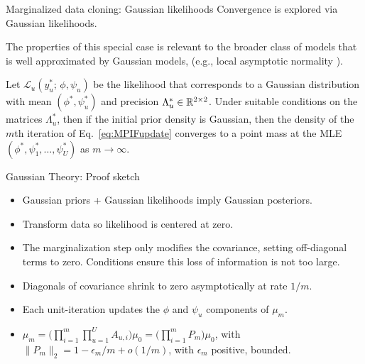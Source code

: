 \documentclass[aspectratio=169]{beamer}\usepackage[]{graphicx}\usepackage[]{xcolor}
\begin{document}
\begin{frame}{Marginalized data cloning: Gaussian likelihoods}
  Convergence is explored via Gaussian likelihoods.
  
  The properties of this special case is relevant to the broader class of models that is well approximated by Gaussian models, (e.g., local asymptotic normality \citep{lecam00}).
  
  \begin{theorem}
    Let $\mathcal{L}_u(y_u^*; \, \phi, \psi_u)$ be the likelihood that corresponds to a Gaussian distribution with mean $(\phi^*, \psi_u^*)$ and precision $\Lambda_u^* \in \mathbb{R}^{2\times2}$. Under suitable conditions on the matrices $\Lambda^*_u$, then if the initial prior density is Gaussian, then the density of the $m$th iteration of Eq.~\ref{eq:MPIFupdate} converges to a point mass at the MLE $(\phi^*, \psi_1^*, \ldots, \psi^*_U)$ as $m\rightarrow \infty$.
  \end{theorem}
\end{frame}

\begin{frame}{Gaussian Theory: Proof sketch}

\begin{itemize}
  \item Gaussian priors + Gaussian likelihoods imply Gaussian posteriors.
  \item Transform data so likelihood is centered at zero.
  \item The marginalization step only modifies the covariance, setting off-diagonal terms to zero. Conditions ensure this loss of information is not too large.
  \item Diagonals of covariance shrink to zero asymptotically at rate $1/m$.
  \item Each unit-iteration updates the $\phi$ and $\psi_u$ components of $\mu_m$.
  \item $\mu_m = \big(\prod_{i = 1}^m\prod_{u = 1}^U A_{u, i}\big) \mu_0 = \big(\prod_{i = 1}^m P_m\big) \mu_0$, with $\|P_m\|_2 = 1 - \epsilon_m/m + o(1/m)$, with $\epsilon_m$ positive, bounded.
\end{itemize}

\end{frame}
\end{document}
